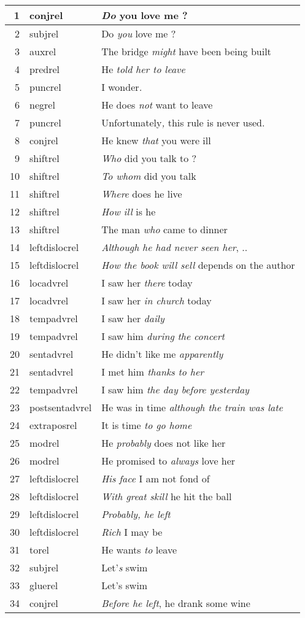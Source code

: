 \begin{tabular}{|r|l|l|} \hline
1&conjrel&{\em Do} you love me ?\\ \hline
2&subjrel&Do {\em you} love me ?\\ \hline
3&auxrel&The bridge {\em might} have been being built\\ \hline
4&predrel&He {\em told her to leave}\\ \hline
5&puncrel&I wonder{\em .}\\ \hline
6&negrel&He does {\em not} want to leave \\ \hline
7&puncrel&Unfortunately{\em ,} this rule is never used.\\ \hline
8&conjrel&He knew {\em that} you were ill\\ \hline
9&shiftrel&{\em Who} did you talk to ?\\ \hline
10&shiftrel&{\em To whom} did you talk \\ \hline
11&shiftrel&{\em Where} does he live\\ \hline
12&shiftrel&{\em How ill} is he\\ \hline
13&shiftrel&The man {\em who} came to dinner\\ \hline
14&leftdislocrel&{\em Although he had never seen her}, ..\\ \hline
15&leftdislocrel&{\em How the book will sell} depends on the author\\ \hline
16&locadvrel&I saw her {\em there} today\\ \hline
17&locadvrel&I saw her {\em in church} today\\ \hline
18&tempadvrel&I saw her {\em daily}\\ \hline
19&tempadvrel&I saw him {\em during the concert}\\ \hline
20&sentadvrel&He didn't like me {\em apparently}\\ \hline
21&sentadvrel&I met him {\em thanks to her}\\ \hline
22&tempadvrel&I saw him {\em the day before yesterday}\\ \hline
23&postsentadvrel&He was in time {\em although the train was late}\\ \hline
24&extraposrel&It is time {\em to go home}\\ \hline
25&modrel&He {\em probably} does not like her\\ \hline
26&modrel&He promised to {\em always} love her\\ \hline
27&leftdislocrel&{\em His face} I am not fond of\\ \hline
28&leftdislocrel&{\em With great skill} he hit the ball\\ \hline
29&leftdislocrel&{\em Probably, he left}\\ \hline
30&leftdislocrel&{\em Rich} I may be\\ \hline
31&torel&He wants {\em to} leave\\ \hline
32&subjrel&Let'{\em s} swim\\ \hline
33&gluerel&Let's swim\\ \hline
34&conjrel&{\em Before he left}, he drank some wine\\ \hline
\end{tabular}
